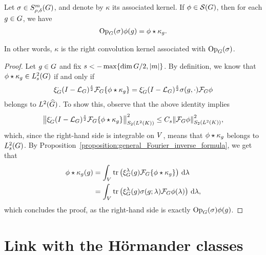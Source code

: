 \begin{proposition}[Quantisation]
\label{proposition:quantisation}
    Let $\sigma \in \SymbolClass{m}{\rho, \delta}$,
    and denote by $\kappa$ its associated kernel.
    If $\phi \in \Schwartz\Group$, then for each $g \in \Group$, we have
    \begin{align*}
        \Op(\sigma) \phi(g) = \conv{\phi}{\kappa_g}.
    \end{align*}

    In other words, $\kappa$ is the right convolution kernel associated with $\Op(\sigma)$.
\end{proposition}
\begin{proof}
    Let $g \in \Group$ and fix $s < -\max \{\dim \Group/2, \abs m\}$.
    By definition, we know that $\conv \phi \kappa_g \in \Sobolev s$ if and only if
    \begin{align*}
        \Rep \dummy \BesselPotential s \Fourier \{\conv \phi {\kappa_g}\}
        = \Rep \dummy \BesselPotential s \sigma(g, \dummy) \Fourier \phi
    \end{align*}
    belongs to $\LebesgueDual 2 \Group$.
    To show this,
    observe that the above identity implies
    \begin{align*}
        \norm[\SchattenClasses 2 {\Lebesgue 2 \CompactGroup}] {\Rep \dummy \BesselPotential s \Fourier \{\conv \phi {\kappa_g}\}}^2
        \leq C_s \norm[\SchattenClasses 2 {\Lebesgue 2 \CompactGroup}] {\Fourier \phi}^2,
    \end{align*}
    which, since the right-hand side is integrable on $\VectorSpace$,
    means that $\conv \phi {\kappa_g}$ belongs to $\Sobolev s$.
    By Proposition~\ref{proposition:general_Fourier_inverse_formula},
    we get that
    \begin{align*}
        \conv \phi {\kappa_g}(g)
        &= \int_\VectorSpace \tr\left(\Rep \lambda(g) \Fourier \{\conv \phi {\kappa_g}\}\right) \dd \lambda\\
        &= \int_\VectorSpace \tr\left(\Rep \lambda(g) \sigma(g; \lambda) \Fourier \phi(\lambda)\right) \dd \lambda,
    \end{align*}
    which concludes the proof,
    as the right-hand side is exactly $\Op(\sigma) \phi(g)$.
\end{proof}

\section{Link with the H\"ormander classes}

